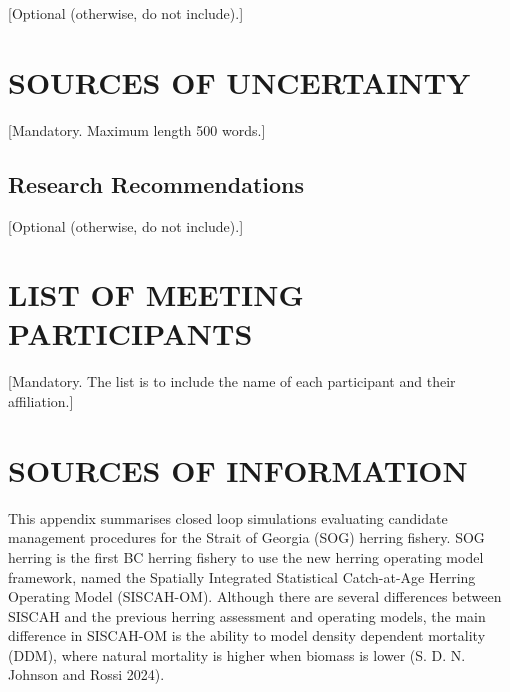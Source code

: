 \documentclass[11pt]{book}
\begin{document}
{[}Optional (otherwise, do not include).{]}

\hypertarget{sources-of-uncertainty}{%
\section*{SOURCES OF UNCERTAINTY}\label{sources-of-uncertainty}}

{[}Mandatory. Maximum length 500 words.{]}

\hypertarget{research-recommendations}{%
\subsection*{Research Recommendations}\label{research-recommendations}}

{[}Optional (otherwise, do not include).{]}

\hypertarget{list-of-meeting-participants}{%
\section*{LIST OF MEETING PARTICIPANTS}\label{list-of-meeting-participants}}

{[}Mandatory. The list is to include the name of each participant and their affiliation.{]}

\hypertarget{sources-of-information}{%
\section*{SOURCES OF INFORMATION}\label{sources-of-information}}

\clearpage

\Appendices


\clearpage

\label{app:a}

This appendix summarises closed loop simulations evaluating candidate management procedures for the Strait of Georgia (SOG) herring fishery. SOG herring is the first BC herring fishery to use the new herring operating model framework, named the Spatially Integrated Statistical Catch-at-Age Herring Operating Model (SISCAH-OM). Although there are several differences between SISCAH and the previous herring assessment and operating models, the main difference in SISCAH-OM is the ability to model density dependent mortality (DDM), where natural mortality is higher when biomass is lower (S. D. N. Johnson and Rossi 2024).
\end{document}
